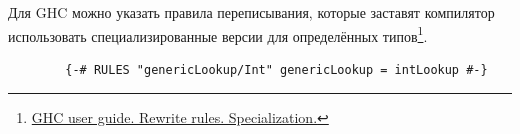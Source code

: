 \documentclass[12pt]{article}
\begin{document}








    \cite{constraint-kind}


    Для GHC можно указать правила переписывания, которые заставят компилятор использовать специализированные версии для определённых типов\footnote{\href{https://downloads.haskell.org/~ghc/6.12.2/docs/html/users\_guide/rewrite-rules.html\#rule-spec}{GHC user guide. Rewrite rules. Specialization.}}.
    \begin{verbatim}
        {-# RULES "genericLookup/Int" genericLookup = intLookup #-}
    \end{verbatim}






\end{document}
